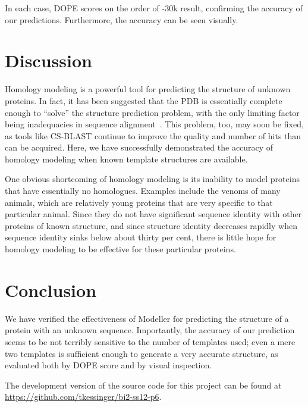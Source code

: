 \documentclass[notitlepage]{report}   %
\begin{document}
In each case, DOPE scores on the order of -30k result, confirming the accuracy of our predictions. Furthermore, the accuracy can be seen visually.

\section*{Discussion}   
Homology modeling is a powerful tool for predicting the structure of unknown proteins. In fact, it has been suggested that the PDB is essentially complete enough to ``solve'' the structure prediction problem, with the only limiting factor being inadequacies in sequence alignment~\cite{zhang2005protein}. This problem, too, may soon be fixed, as tools like CS-BLAST continue to improve the quality and number of hits than can be acquired. Here, we have successfully demonstrated the accuracy of homology modeling when known template structures are available.

One obvious shortcoming of homology modeling is its inability to model proteins that have essentially no homologues. Examples include the venoms of many animals, which are relatively young proteins that are very specific to that particular animal. Since they do not have significant sequence identity with other proteins of known structure, and since structure identity decreases rapidly when sequence identity sinks below about thirty per cent, there is little hope for homology modeling to be effective for these particular proteins.

\section*{Conclusion}   
We have verified the effectiveness of Modeller for predicting the structure of a protein with an unknown sequence. Importantly, the accuracy of our prediction seems to be not terribly sensitive to the number of templates used; even a mere two templates is sufficient enough to generate a very accurate structure, as evaluated both by DOPE score and by visual inspection.

The development version of the source code for this project can be found at \url{https://github.com/tkessinger/bi2-ss12-p6}.



\end{document}
